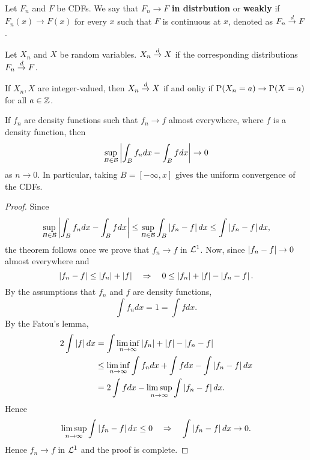 \begin{definition}
    Let $F_n$ and $F$ be CDFs. We say that $F_n\to F$ \textbf{in distrbution} 
    or \textbf{weakly} if $F_n(x)\to F(x)$ for every $x$ such that 
    $F$ is continuous at $x$, denoted as $F_n\dto F$. 
\end{definition}

\begin{definition}
    Let $X_n$ and $X$ be random variables. $X_n\dto X$ if 
    the corresponding distributions $F_n\dto F$. 
\end{definition}

\begin{remark}
    If $X_n, X$ are integer-valued, then $X_n\dto X$ if and 
    onliy if $\P(X_n = a)\to \P(X = a)$ for all $a\in\Z$. 
\end{remark}

\begin{theorem}[Scheff\'e]
    If $f_n$ are density functions such that $f_n\to f$ almost 
    everywhere, where $f$ is a density function, then 
    \begin{equation*}
        \sup_{B\in\B}\abs{\int_B f_ndx - \int_B fdx}\to 0
    \end{equation*}
    as $n\to 0$. In particular, taking $B = [-\infty, x]$ 
    gives the uniform convergence of the CDFs. 
\end{theorem}
\begin{proof}
    Since 
    \begin{equation*}
        \sup_{B\in\B}\abs{\int_B f_ndx-\int_Bfdx} 
        \leq \sup_{B\in\B}\int_B \abs{f_n-f}dx
        \leq \int\abs{f_n - f}dx, 
    \end{equation*}
    the theorem follows once we prove that $f_n\to f$ in $\L^1$. 
    Now, since $\abs{f_n - f}\to 0$ almost everywhere and 
    \begin{equation*}
        \abs{f_n - f}\leq \abs{f_n} + \abs{f}
        \quad\Rightarrow\quad 
        0\leq \abs{f_n}+\abs{f}-\abs{f_n - f}. 
    \end{equation*}
    By the assumptions that $f_n$ and $f$ are density functions,  
    \begin{equation*}
        \int f_ndx = 1 = \int fdx. 
    \end{equation*}
    By the Fatou's lemma, 
    \begin{equation*}
        \begin{split}
            2\int\abs{f}dx &= \int\liminf_{n\to\infty}\abs{f_n}+\abs{f}-\abs{f_n-f} \\
            &\leq \liminf_{n\to\infty}\int f_ndx + \int fdx - \int\abs{f_n - f}dx \\ 
            &= 2\int fdx - \limsup_{n\to\infty} \int\abs{f_n - f}dx.
        \end{split}
    \end{equation*} 
    Hence 
    \begin{equation*}
        \limsup_{n\to\infty}\int\abs{f_n - f}dx\leq 0
        \quad\Rightarrow\quad 
        \int\abs{f_n - f}dx\to 0.
    \end{equation*}
    Hence $f_n\to f$ in $\L^1$ and the proof is complete. 
\end{proof}

